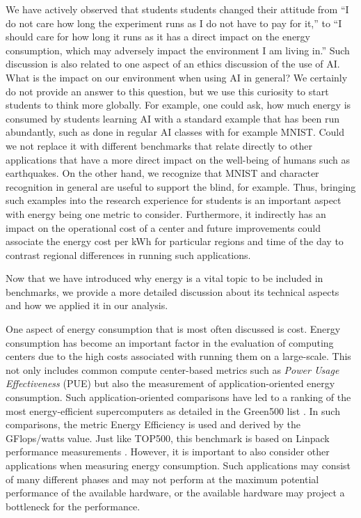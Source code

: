 We have actively observed that students 
students changed their attitude from ``I do not care how long the experiment runs as I do not have to pay for it,'' to ``I should care for how long it runs as it has a direct impact on the energy consumption, which may adversely impact the environment I am living in.''
Such discussion is also related to one aspect of an ethics discussion of the use of AI. What is the impact on our environment when using AI in general? We certainly do not provide an answer to this question, but we use this curiosity to start students to think more globally. For example, one could ask, how much energy is consumed by students learning AI with a standard example that has been run abundantly, such as done in regular AI classes with for example MNIST. Could we not replace it with different benchmarks that relate directly to other applications that have a more direct impact on the well-being of humans such as earthquakes. On the other hand, we recognize that MNIST and character recognition in general are useful to support the blind, for example. Thus, bringing such examples into the research experience for students is an important aspect with energy being one metric to consider. Furthermore, it indirectly has an impact on the operational cost of a center and future improvements could associate the energy cost per kWh for particular regions and time of the day to contrast regional differences in running such applications.
 
Now that we have introduced why energy is a vital topic to be included in benchmarks, we provide a more detailed discussion about its technical aspects and how we applied it in our analysis.

One aspect of energy consumption that is most often discussed is cost.
Energy consumption has become an important factor in the evaluation of computing centers due to the high costs associated with running them on a large-scale. This not only includes common compute center-based metrics such as {\em Power Usage Effectiveness} (PUE) but also the measurement of application-oriented energy consumption.  Such application-oriented comparisons have led to a ranking of the most energy-efficient supercomputers as detailed in the Green500 list \citep{green500}. In such comparisons, the metric Energy Efficiency is used and derived by the GFlops/watts value. Just like TOP500, this benchmark is based on Linpack performance measurements \cite{www-top500}.  However, it is important to also consider other applications when measuring energy consumption. Such applications may consist of many different phases and may not perform at the maximum potential performance of the available hardware, or the available hardware may project a bottleneck for the performance.

